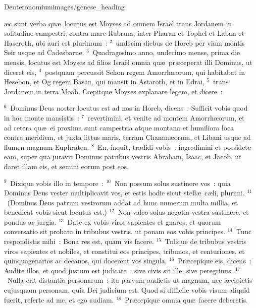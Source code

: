 {Deuteronomium}{images/genese_heading}


\bchapter
{}\ae c sunt verba qu\ae\ locutus est Moyses ad omnem Isra\"el trans Jordanem in solitudine campestri, contra mare Rubrum, inter Pharan et Tophel et Laban et Haseroth, ubi auri est plurimum~:
${}^{2}$~undecim diebus de Horeb per viam montis Seir usque ad Cadesbarne.
${}^{3}$~Quadragesimo anno, undecimo mense, prima die mensis, locutus est Moyses ad filios Isra\"el omnia qu\ae\ pr\ae ceperat illi Dominus, ut diceret eis,
${}^{4}$~postquam percussit Sehon regem Amorrh\ae orum, qui habitabat in Hesebon, et Og regem Basan, qui mansit in Astaroth, et in Edrai,
${}^{5}$~trans Jordanem in terra Moab. Cœpitque Moyses explanare legem, et dicere~:


${}^{6}$~Dominus Deus noster locutus est ad nos in Horeb, dicens~: Sufficit vobis quod in hoc monte mansistis~:
${}^{7}$~revertimini, et venite ad montem Amorrh\ae orum, et ad cetera qu\ae\ ei proxima sunt campestria atque montana et humiliora loca contra meridiem, et juxta littus maris, terram Chanan\ae orum, et Libani usque ad flumen magnum Euphraten.
${}^{8}$~En, inquit, tradidi vobis~: ingredimini et possidete eam, super qua juravit Dominus patribus vestris Abraham, Isaac, et Jacob, ut daret illam eis, et semini eorum post eos.


${}^{9}$~Dixique vobis illo in tempore~:
${}^{10}$~Non possum solus sustinere vos~: quia Dominus Deus vester multiplicavit vos, et estis hodie sicut stell\ae\ c\ae li, plurimi.
${}^{11}$~(Dominus Deus patrum vestrorum addat ad hunc numerum multa millia, et benedicat vobis sicut locutus est.)
${}^{12}$~Non valeo solus negotia vestra sustinere, et pondus ac jurgia.
${}^{13}$~Date ex vobis viros sapientes et gnaros, et quorum conversatio sit probata in tribubus vestris, ut ponam eos vobis principes.
${}^{14}$~Tunc respondistis mihi~: Bona res est, quam vis facere.
${}^{15}$~Tulique de tribubus vestris viros sapientes et nobiles, et constitui eos principes, tribunos, et centuriones, et quinquagenarios ac decanos, qui docerent vos singula.
${}^{16}$~Pr\ae cepique eis, dicens~: Audite illos, et quod justum est judicate~: sive civis sit ille, sive peregrinus.
${}^{17}$~Nulla erit distantia personarum~: ita parvum audietis ut magnum, nec accipietis cujusquam personam, quia Dei judicium est. Quod si difficile vobis visum aliquid fuerit, referte ad me, et ego audiam.
${}^{18}$~Pr\ae cepique omnia qu\ae\ facere deberetis.



